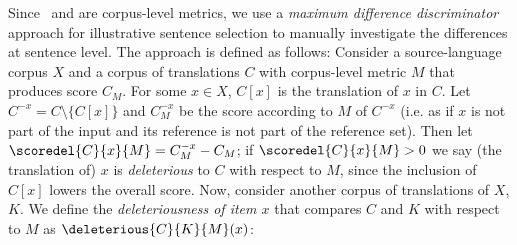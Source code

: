 

Since \bleu\ and  are corpus-level metrics, we use a \textit{maximum difference discriminator} approach for illustrative sentence selection to manually investigate the differences at sentence level.
The approach is defined as follows: Consider a source-language corpus $X$ and a corpus of translations $C$ with corpus-level metric $M$ that produces score $C_M$. 
For some $x \in X$, $C[x]$ is the translation of $x$ in $C$.
Let $C^{-x} = C \setminus \{C[x]\}$ and $C^{-x}_M$ be the score according to $M$ of $C^{-x}$ (i.e. as if $x$ is not part of the input and its reference is not part of the reference set). 
Then let $\scoredel{C}{x}{M} = C^{-x}_M - C_M$; if $\scoredel{C}{x}{M} > 0$ we say (the translation of) $x$ is \textit{deleterious} to $C$ with respect to $M$, since the inclusion of $C[x]$ lowers the overall score.
Now, consider another corpus of translations of $X$, $K$. 
We define the \textit{deleteriousness of item $x$} that compares $C$ and $K$ with respect to $M$ as $\deleterious{C}{K}{M}(x)$:


